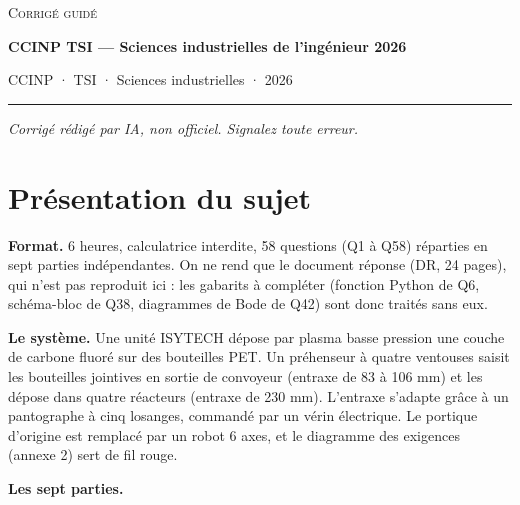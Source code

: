 \documentclass[11pt,a4paper]{article}
\begin{document}
\thispagestyle{plain}
\begin{center}
  {\small\scshape Corrigé guidé}\par\smallskip
  {\LARGE\bfseries CCINP TSI — Sciences industrielles de l'ingénieur 2026\par}\medskip
  {\large CCINP · TSI · Sciences industrielles · 2026\par}
\end{center}
\vspace{2pt}\hrule\vspace{8pt}

\emph{Corrigé rédigé par IA, non officiel. Signalez toute erreur.}

\hypertarget{pruxe9sentation-du-sujet}{%
\section{Présentation du sujet}\label{pruxe9sentation-du-sujet}}

\textbf{Format.} 6 heures, calculatrice interdite, 58 questions (Q1 à Q58) réparties en sept parties indépendantes. On ne rend que le document réponse (DR, 24 pages), qui n'est pas reproduit ici : les gabarits à compléter (fonction Python de Q6, schéma-bloc de Q38, diagrammes de Bode de Q42) sont donc traités sans eux.

\textbf{Le système.} Une unité ISYTECH dépose par plasma basse pression une couche de carbone fluoré sur des bouteilles PET. Un préhenseur à quatre ventouses saisit les bouteilles jointives en sortie de convoyeur (entraxe de 83 à 106 mm) et les dépose dans quatre réacteurs (entraxe de 230 mm). L'entraxe s'adapte grâce à un pantographe à cinq losanges, commandé par un vérin électrique. Le portique d'origine est remplacé par un robot 6 axes, et le diagramme des exigences (annexe 2) sert de fil rouge.

\textbf{Les sept parties.}
\end{document}
